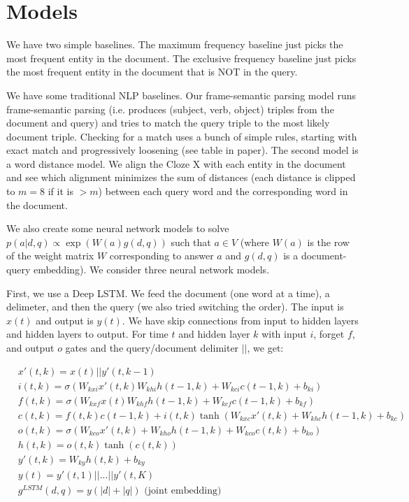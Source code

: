 \documentclass[a4paper]{article}
\begin{document}
\section{Models}
We have two simple baselines. The maximum frequency baseline just picks the
most frequent entity in the document. The exclusive frequency baseline just
picks the most frequent entity in the document that is NOT in the query.

We have some traditional NLP baselines. Our frame-semantic parsing model
runs frame-semantic parsing (i.e. produces (subject, verb, object) triples
from the document and query) and tries to match the query triple to the most
likely document triple. Checking for a match uses a bunch of simple rules,
starting with exact match and progressively loosening (see table in paper). The
second model is a word distance model. We align the Cloze X with each
entity in the document and see which alignment minimizes the sum of distances
(each distance is clipped to $m=8$ if it is $> m$) between each query word
and the corresponding word in the document.

We also create some neural network models to solve $p(a | d, q) \propto
\exp(W(a) g(d, q))$ such that $a \in V$ (where $W(a)$ is the row of the
weight matrix $W$ corresponding to answer $a$ and $g(d, q)$ is a document-query
embedding). We consider three neural network models.

First, we use a Deep LSTM. We feed the document (one word at a time), a
delimeter, and then the query (we also tried switching the order). The
input is $x(t)$ and output is $y(t)$. We have skip connections from
input to hidden layers and hidden layers to output. For time $t$ and hidden
layer $k$ with input $i$, forget $f$, and output $o$ gates and the
query/document delimiter $||$, we get:

\begin{align}
  & x'(t, k) = x(t) || y'(t, k-1) \\
  & i(t, k) = \sigma(W_{kxi} x'(t, k) W_{khi} h(t-1, k) + W_{kci} c(t-1, k) + b_{ki}) \\
  & f(t, k) = \sigma(W_{kxf} x(t) W_{khf} h(t-1, k) + W_{kcf} c(t-1, k) + b_{kf}) \\
  & c(t, k) = f(t, k) c(t - 1, k) + i(t, k) \tanh(W_{kxc} x'(t, k) + W_{khc} h(t-1, k) + b_{kc}) \\
  & o(t, k) = \sigma(W_{kco} x'(t, k) + W_{kho} h(t-1, k) + W_{kco} c(t, k) + b_{ko}) \\
  & h(t, k) = o(t, k) \tanh(c(t, k)) \\
  & y'(t, k) = W_{ky} h(t, k) + b_{ky} \\
  & y(t) = y'(t, 1) || ... || y'(t, K) \\
  & g^{LSTM}(d, q) = y(|d| + |q|) \text{ (joint embedding)}
\end{align}
\end{document}
